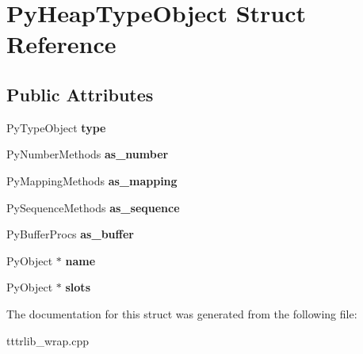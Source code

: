 \hypertarget{struct_py_heap_type_object}{}\section{Py\+Heap\+Type\+Object Struct Reference}
\label{struct_py_heap_type_object}
\subsection*{Public Attributes}
\begin{DoxyCompactItemize}
\item 
\mbox{\label{struct_py_heap_type_object_a8b961137de4ebeed5a5d2e4b47ee1ca7}} 
Py\+Type\+Object {\bfseries type}
\item 
\mbox{\label{struct_py_heap_type_object_a795de378df40d11321c0dbe463759560}} 
Py\+Number\+Methods {\bfseries as\+\_\+number}
\item 
\mbox{\label{struct_py_heap_type_object_a3112d193aea288a92036360bec1ce0a5}} 
Py\+Mapping\+Methods {\bfseries as\+\_\+mapping}
\item 
\mbox{\label{struct_py_heap_type_object_ad553caad5da3a7004aae1b7ac0289f12}} 
Py\+Sequence\+Methods {\bfseries as\+\_\+sequence}
\item 
\mbox{\label{struct_py_heap_type_object_a026c64b0a5163ea580e79640ecf209de}} 
Py\+Buffer\+Procs {\bfseries as\+\_\+buffer}
\item 
\mbox{\label{struct_py_heap_type_object_a5440c0413b3c519d996119695c957c80}} 
Py\+Object $\ast$ {\bfseries name}
\item 
\mbox{\label{struct_py_heap_type_object_a15212a8f85d939b3f4b133ecda1b62e5}} 
Py\+Object $\ast$ {\bfseries slots}
\end{DoxyCompactItemize}


The documentation for this struct was generated from the following file\+:\begin{DoxyCompactItemize}
\item 
tttrlib\+\_\+wrap.\+cpp\end{DoxyCompactItemize}
